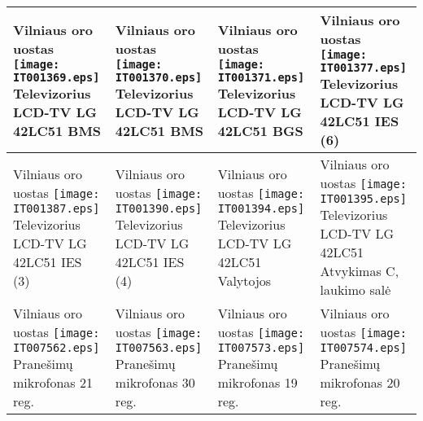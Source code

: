 \documentclass[a4paper,12pt]{article}
\begin{document}
\begin{supertabular}{|p{4.2cm}|p{4.2cm}|p{4.2cm}|p{4.2cm}|}
Vilniaus oro uostas \newline \texttt{[image: IT001369.eps]} \newline Televizorius LCD-TV LG 42LC51 \newline \footnotesize {BMS} & Vilniaus oro uostas \newline \texttt{[image: IT001370.eps]} \newline Televizorius LCD-TV LG 42LC51 \newline \footnotesize {BMS} & Vilniaus oro uostas \newline \texttt{[image: IT001371.eps]} \newline Televizorius LCD-TV LG 42LC51 \newline \footnotesize {BGS} & Vilniaus oro uostas \newline \texttt{[image: IT001377.eps]} \newline Televizorius LCD-TV LG 42LC51 \newline \footnotesize {IES (6)}\\\hline
Vilniaus oro uostas \newline \texttt{[image: IT001387.eps]} \newline Televizorius LCD-TV LG 42LC51 \newline \footnotesize {IES (3)} & Vilniaus oro uostas \newline \texttt{[image: IT001390.eps]} \newline Televizorius LCD-TV LG 42LC51 \newline \footnotesize {IES (4)} & Vilniaus oro uostas \newline \texttt{[image: IT001394.eps]} \newline Televizorius LCD-TV LG 42LC51 \newline \footnotesize {Valytojos} & Vilniaus oro uostas \newline \texttt{[image: IT001395.eps]} \newline Televizorius LCD-TV LG 42LC51 \newline \footnotesize {Atvykimas C, laukimo salė}\\\hline
Vilniaus oro uostas \newline \texttt{[image: IT007562.eps]} \newline Pranešimų mikrofonas \newline \footnotesize {21 reg.} & Vilniaus oro uostas \newline \texttt{[image: IT007563.eps]} \newline Pranešimų mikrofonas \newline \footnotesize {30 reg.} & Vilniaus oro uostas \newline \texttt{[image: IT007573.eps]} \newline Pranešimų mikrofonas \newline \footnotesize {19 reg.} & Vilniaus oro uostas \newline \texttt{[image: IT007574.eps]} \newline Pranešimų mikrofonas \newline \footnotesize {20 reg.}\\\hline

\end{supertabular}
\end{document}
